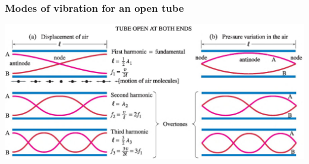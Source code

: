 \documentclass[]{beamer}
\begin{document}









\begin{frame}
\frametitle{Modes of vibration for an open tube}

  \begin{center}
  \includegraphics[height=2.in]{images4/tubeopen.jpg}
\end{center}


  \end{frame}









\end{document}
